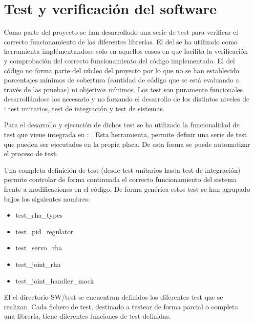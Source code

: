
\section{Test y verificación del software} \label{sec:SW:test}
    Como parte del proyecto se han desarrollado una serie de test para verificar el correcto funcionamiento de las diferentes librerías. El  del  se ha utilizado como herramienta implémentandose solo en aquellos casos en que facilita la verificación y comprobación del correcto funcionamiento del código implementado. El  del código no forma parte del núcleo del proyecto por lo que no se han establecido porcentajes mínimos de cobertura (cantidad de código que se está evaluando a través de las pruebas) ni objetivos mínimos. Los test son puramente funcionales desarrollándose los necesario y no forzando el desarrollo de los distintos niveles de : test unitarios, test de integración y test de sistemas. 

    Para el desarrollo y ejecución de dichos test se ha utilizado la funcionalidad de test que viene integrada en : . Esta herramienta, permite definir una serie de test que pueden ser ejecutados en la propia placa. De esta forma se puede automatizar el proceso de test.

    Una completa definición de test (desde test unitarios hasta test de integración) permite controlar de forma continuada el correcto funcionamiento del sistema frente a modificaciones en el código. De forma genérica estos test se han agrupado bajos los siguientes nombres:

    \begin{itemize}
        \item test\_rha\_types
        \item test\_pid\_regulator
        \item test\_servo\_rha
        \item test\_joint\_rha
        \item test\_joint\_handler\_mock
    \end{itemize}

    El el directorio SW/test se encuentran definidos los diferentes test que se realizan. Cada fichero de test, destinado a testear de forma parcial o completa una librería, tiene diferentes funciones de test definidas.

